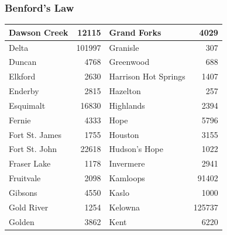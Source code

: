 \documentclass[xcolor=dvipsnames]{beamer}
\begin{document}
\begin{frame}
  \frametitle{Benford's Law}
\begin{tabular}{|l|r|l|r|}
\hline
Dawson Creek   & 12115  & Grand Forks          & 4029   \\
\hline
Delta          & 101997 & Granisle             & 307    \\
\hline
Duncan         & 4768   & Greenwood            & 688    \\
\hline
Elkford        & 2630   & Harrison Hot Springs & 1407   \\
\hline
Enderby        & 2815   & Hazelton             & 257    \\
\hline
Esquimalt      & 16830  & Highlands            & 2394   \\
\hline
Fernie         & 4333   & Hope                 & 5796   \\
\hline
Fort St. James & 1755   & Houston              & 3155   \\
\hline
Fort St. John  & 22618  & Hudson's Hope        & 1022   \\
\hline
Fraser Lake    & 1178   & Invermere            & 2941   \\
\hline
Fruitvale      & 2098   & Kamloops             & 91402  \\
\hline
Gibsons        & 4550   & Kaslo                & 1000   \\
\hline
Gold River     & 1254   & Kelowna              & 125737 \\
\hline
Golden         & 3862   & Kent                 & 6220   \\
\hline
\end{tabular}

\end{frame}
\end{document}
